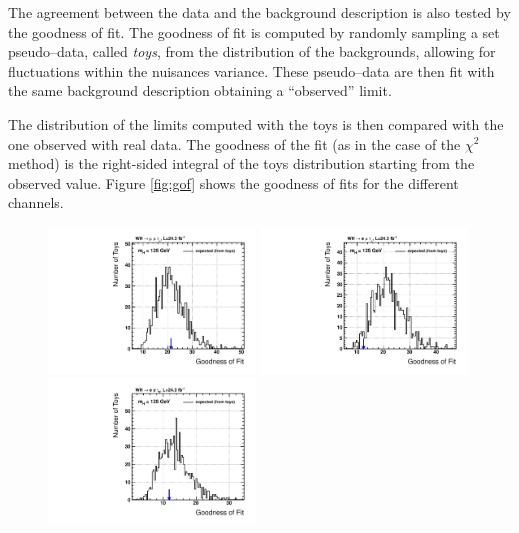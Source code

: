 The agreement between the data and the background description is also tested by the goodness of fit. The goodness of fit is computed by randomly sampling a set pseudo--data, called \emph{toys}, from the distribution of the backgrounds, allowing for fluctuations within the nuisances variance. These pseudo--data are then fit with the same background description obtaining a ``observed'' limit. 

The distribution of the limits computed with the toys is then compared with the one observed with real data. The goodness of the fit (as in the case of the $\chi^2$ method) is the right-sided integral of the toys distribution starting from the observed value. Figure \ref{fig:gof} shows the goodness of fits for the different channels.

\begin{figure}
\begin{center}
  \includegraphics[width=0.49\textwidth]{4_Analisys/pics/GoF/mmt-goodness-of-fit-125.pdf}
  \includegraphics[width=0.49\textwidth]{4_Analisys/pics/GoF/emt-goodness-of-fit-125.pdf}\\
  \includegraphics[width=0.49\textwidth]{4_Analisys/pics/GoF/eet-goodness-of-fit-125.pdf}

\end{center}
\end{figure}
